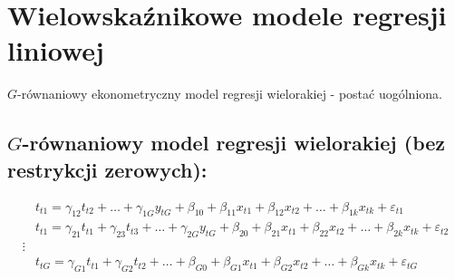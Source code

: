 \section{Wielowskaźnikowe modele regresji liniowej}
$ G $-równaniowy ekonometryczny model regresji wielorakiej - postać uogólniona.

\subsection{$ G $-równaniowy model regresji wielorakiej (bez restrykcji zerowych):}
\begin{align*}
&t_{t1}=\gamma_{12}t_{t2}+\dots+\gamma_{1G}y_{tG}+\beta_{10}+\beta_{11}x_{t1}+\beta_{12}x_{t2}+\dots+\beta_{1k}x_{tk}+\varepsilon_{t1}\\
&t_{t1}=\gamma_{21}t_{t1}+\gamma_{23}t_{t3}+\dots+\gamma_{2G}y_{tG}+\beta_{20}+\beta_{21}x_{t1}+\beta_{22}x_{t2}+\dots+\beta_{2k}x_{tk}+\varepsilon_{t2}\\
\vdots\\
&t_{tG}=\gamma_{G1}t_{t1}+\gamma_{G2}t_{t2}+\dots+\beta_{G0}+\beta_{G1}x_{t1}+\beta_{G2}x_{t2}+\dots+\beta_{Gk}x_{tk}+\varepsilon_{tG}
\end{align*}

